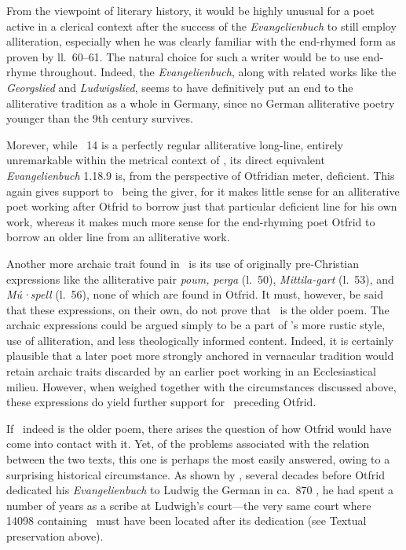 From the viewpoint of literary history, it would be highly unusual for a poet active in a clerical context after the success of the \emph{Evangelienbuch} to still employ alliteration, especially when he was clearly familiar with the end-rhymed form as proven by ll.~60--61.  The natural choice for such a writer would be to use end-rhyme throughout.  Indeed, the \emph{Evangelienbuch}, along with related works like the \emph{Georgslied} and \emph{Ludwigslied}, seems to have definitively put an end to the alliterative tradition as a whole in Germany, since no German alliterative poetry younger than the 9th century survives.

Morever, while \Muspilli\ 14 is a perfectly regular alliterative long-line, entirely unremarkable within the metrical context of \Muspilli, its direct equivalent \emph{Evangelienbuch} 1.18.9 is, from the perspective of Otfridian meter, deficient.  This again gives support to \Muspilli\ being the giver, for it makes little sense for an alliterative poet working after Otfrid to borrow just that particular deficient line for his own work, whereas it makes much more sense for the end-rhyming poet Otfrid to borrow an older line from an alliterative work.

Another more archaic trait found in \Muspilli\ is its use of originally pre-Christian expressions like the alliterative pair \emph{poum, perga} (l.~50), \emph{Mittila-gart} (l.~53), and \emph{Mú·spell} (l.~56), none of which are found in Otfrid.  It must, however, be said that these expressions, on their own, do not prove that \Muspilli\ is the older poem.  The archaic expressions could be argued simply to be a part of \Muspilli’s more rustic style, use of alliteration, and less theologically informed content.  Indeed, it is certainly plausible that a later poet more strongly anchored in vernacular tradition would retain archaic traits discarded by an earlier poet working in an Ecclesiastical milieu.  However, when weighed together with the circumstances discussed above, these expressions do yield further support for \Muspilli\ preceding Otfrid.

If \Muspilli\ indeed is the older poem, there arises the question of how Otfrid would have come into contact with it.  Yet, of the problems associated with the relation between the two texts, this one is perhaps the most easily answered, owing to a surprising historical circumstance.  As shown by \textcite[406]{Haubrichs1978}, several decades before Otfrid dedicated his \emph{Evangelienbuch} to Ludwig the German in ca.~870 \ce, he had spent a number of years as a scribe at Ludwigh’s court---the very same court where 14098 containing \Muspilli\ must have been located after its dedication (see Textual preservation above).

